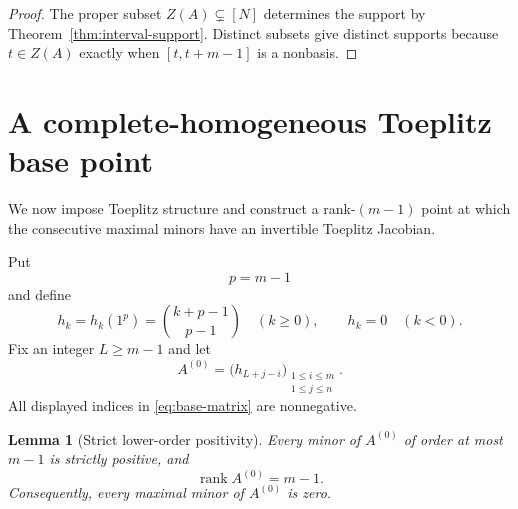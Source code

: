 \documentclass{amsart}
\numberwithin{equation}{section}
\newtheorem{lemma}[theorem]{Lemma}
\theoremstyle{definition}
\theoremstyle{remark}
\DeclareMathOperator{\rank}{rank}
\begin{document}
\begin{proof}
The proper subset $Z(A)\subsetneq[N]$ determines the support by Theorem~\ref{thm:interval-support}.  Distinct subsets give distinct supports because $t\in Z(A)$ exactly when $[t,t+m-1]$ is a nonbasis.
\end{proof}

\section{A complete-homogeneous Toeplitz base point}\label{sec:base}

We now impose Toeplitz structure and construct a rank-$(m-1)$ point at which the consecutive maximal minors have an invertible Toeplitz Jacobian.

Put
\[
 p=m-1
\]
and define
\begin{equation}\label{eq:complete-h}
 h_k=h_k(1^p)=\binom{k+p-1}{p-1}\quad(k\ge0),
 \qquad h_k=0\quad(k<0).
\end{equation}
Fix an integer $L\ge m-1$ and let
\begin{equation}\label{eq:base-matrix}
 A^{(0)}=\bigl(h_{L+j-i}\bigr)_{\substack{1\le i\le m\\1\le j\le n}}.
\end{equation}
All displayed indices in \eqref{eq:base-matrix} are nonnegative.

\begin{lemma}[Strict lower-order positivity]\label{lem:base-positive}
Every minor of $A^{(0)}$ of order at most $m-1$ is strictly positive, and
\[
 \rank A^{(0)}=m-1.
\]
Consequently, every maximal minor of $A^{(0)}$ is zero.
\end{lemma}
\end{document}
